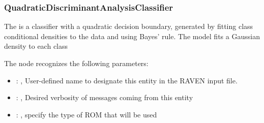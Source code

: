 \subsubsection{QuadraticDiscriminantAnalysisClassifier}
  The  is a classifier with a quadratic decision
  boundary,     generated by fitting class conditional densities to the data and using Bayes' rule.
  The model fits a Gaussian density to each class

  The  node recognizes the following parameters:
    \begin{itemize}
      \item {}: , 
        User-defined name to designate this entity in the RAVEN input file.
      \item {}: , 
        Desired verbosity of messages coming from this entity
      \item {}: , 
        specify the type of ROM that will be used
  \end{itemize}

